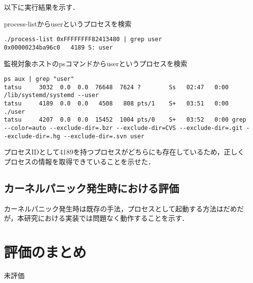 以下に実行結果を示す．

\begin{itembox}[l]{process-listからuserというプロセスを検索}
    \begin{verbatim}
./process-list 0xFFFFFFFF82413480 | grep user
0x00000234ba96c0   4189 S: user
    \end{verbatim}
\end{itembox}

\begin{itembox}[l]{監視対象ホストのpsコマンドからuserというプロセスを検索}
    \begin{verbatim}
ps aux | grep "user"
tatsu     3032  0.0  0.0  76648  7624 ?        Ss   02:47   0:00 /lib/systemd/systemd --user
tatsu     4189  0.0  0.0   4508   808 pts/1    S+   03:51   0:00 ./user
tatsu     4207  0.0  0.0  15452  1004 pts/0    S+   03:52   0:00 grep --color=auto --exclude-dir=.bzr --exclude-dir=CVS --exclude-dir=.git --exclude-dir=.hg --exclude-dir=.svn user
    \end{verbatim}
\end{itembox}

プロセスIDとして4189を持つプロセスがどちらにも存在しているため，正しくプロセスの情報を取得できていることを示せた．

\subsection{カーネルパニック発生時における評価}

カーネルパニック発生時は既存の手法，プロセスとして起動する方法はだめだが，本研究における実装では問題なく動作することを示す．

\section{評価のまとめ}

未評価
